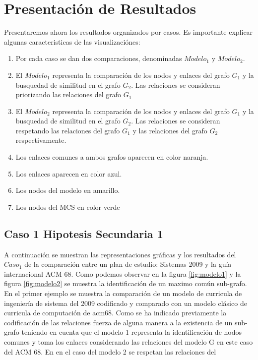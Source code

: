 \clearpage

\section{Presentación de Resultados}

Presentaremos ahora los resultados organizados por casos. Es importante explicar algunas caracteristicas de las visualizaciónes:

\begin{enumerate}
	\item Por cada caso se dan dos comparaciones, denominadas $Modelo_1$ y $Modelo_2$.
	\item El $Modelo_1$ representa la comparación de los nodos y enlaces del grafo $G_1$ y la busquedad de similitud en el grafo $G_2$. Las relaciones se consideran priorizando las relaciones del grafo $G_1$
	\item El $Modelo_2$ representa la comparación de los nodos y enlaces del grafo $G_1$ y la busquedad de similitud en el grafo $G_2$. Las relaciones se consideran respetando las relaciones del grafo $G_1$ y las relaciones del grafo $G_2$ respectivamente.
	\item Los enlaces comunes a ambos grafos aparecen en color naranja.
	\item Los enlaces aparecen en color azul.
	\item Los nodos del modelo en amarillo.
	\item Los nodos del MCS en color verde

\end{enumerate}

\subsection{Caso 1 Hipotesis Secundaria 1}

A continuación se muestran las representaciones gráficas y los resultados del $Caso_1$ de la comparación entre un plan de estudio: Sistemas 2009 y la guía internacional ACM 68. Como podemos observar en la figura \ref{fig:modelo1} y la figura \ref{fig:modelo2} se muestra la identificación de un maximo común sub-grafo. En el primer ejemplo se muestra la comparación de un modelo de curricula de ingeniería de sistema del 2009 codificado y comparado con un modelo clásico de curricula de computación de acm68. Como se ha indicado previamente la codificación de las relaciones fuerza de alguna manera a la existencia de un sub-grafo teniendo en cuenta que el modelo 1 representa la identificación de nodos comunes y toma los enlaces considerando las relaciones del modelo G en este caso del ACM 68. En en el caso del modelo 2 se respetan las relaciones del 

